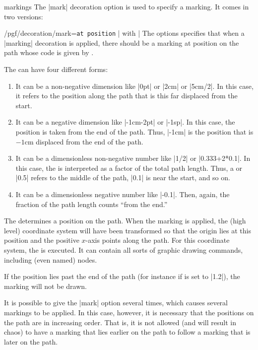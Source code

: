 \begin{decoration}{markings}
  The |mark| decoration option is used to specify a marking. It comes
  in two versions:
  \begin{key}{/pgf/decoration/mark=\texttt{at position}
      | with |}
    The options specifies that when a |marking| decoration is applied,
    there should be a marking at position  on the path whose
    code is given by .

    The  can have four different forms:
    \begin{enumerate}
    \item It can be a non-negative dimension like |0pt| or |2cm| or
      |5cm/2|. In this case, it refers to the position along the path
      that is this far displaced from the start.
    \item It can be a negative dimension like |-1cm-2pt| or |-1sp|. In
      this case, the position is taken from the end of the path. Thus,
      |-1cm| is the position that is $-1$cm displaced from the end of
      the path.
    \item It can be a dimensionless non-negative number like |1/2| or
      |0.333+2*0.1|. In this case, the  is interpreted as a
      factor of the total path length. Thus, a  or |0.5|
      refers to the middle of the path, |0.1| is near the start, and
      so on.
    \item It can be a dimensionless negative number like |-0.1|. Then,
      again, the fraction of the path length counts ``from the end.''
    \end{enumerate}

    The  determines a position on the path. When the marking
    is applied, the (high level) coordinate system will have been
    transformed so that the origin lies at this position and the
    positive $x$-axis points along the path. For this coordinate
    system, the  is executed. It can contain all sorts of
    graphic drawing commands, including (even named) nodes.

    If the position lies past the end of the path (for
    instance if  is set to |1.2|), the marking will not be
    drawn.

    It is possible to give the |mark| option several times, which
    causes several markings to be applied. In this case, however, it
    is necessary that the positions on the path are in increasing
    order. That is, it is not allowed (and will result in chaos) to
    have a marking that lies earlier on the path to follow a marking
    that is later on the path.


\end{key}
\end{decoration}
